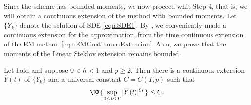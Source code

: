 	Since the \SM scheme has bounded moments, we now proceed whit Step 4, that is,  we will obtain a
continuous extension of the \SM method with bounded moments. 
Let $\{Y_k\}$ denote the \SM solution of SDE \eqref{eqn:SDE1}.
By , we conveniently made a continuous extension for the \SM approximation, from the 
time continuous extension of the EM method \eqref{eqn:EMContinuousExtension}.
Also, we prove that the  moments of the Linear Steklov extension remains bounded.
\begin{corollary}\label{col:ContinuousExtBoundedMoments}
	Let  hold and suppose  $0<h<1$ and $p\geq 
	2$. Then there is a continuous extension $\overline{Y}(t)$ of $\{Y_k\}$  and a universal constant $C=C(T,p)$ such 
	that
	\begin{equation*}
		\EX{\sup_{0\leq t \leq T} |\overline{Y}(t)|^{2p} }
		\leq C.
	\end{equation*}
\end{corollary}
